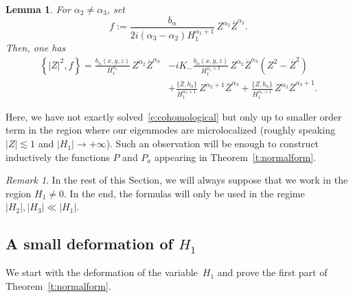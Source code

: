 \documentclass[JEP,XML,SOM,Unicode, NoEqCountersInSection,published]{cedram}
\theoremstyle{plain}
\newtheorem{lemm}[theo]{Lemma}
\theoremstyle{definition}
\theoremstyle{remark}
\newtheorem{rema}[theo]{Remark}
\begin{document}
\begin{lemm}\label{l:cohomological} For $\alpha_2\neq \alpha_3$, set
\[
f:=\frac{b_\alpha}{2i(\alpha_3-\alpha_2)H_1^{\alpha_1+1}}\,Z^{\alpha_2}\overline{Z}^{\alpha_3}.
\]
Then, one has
\begin{align*}
\left\{|Z|^2,f\right\} =\frac{b_\alpha(x,y,z)}{H_1^{\alpha_1}}\,Z^{\alpha_2}\overline{Z}^{\alpha_3}&-iK_-\frac{b_\alpha(x,y,z)}{H_1^{\alpha_1+2}}\,Z^{\alpha_2}\overline{Z}^{\alpha_3}(Z^2-\overline{Z}^2)\\
& +\frac{\{\overline{Z},b_\alpha\}}{H_1^{\alpha_1+1}}\,Z^{\alpha_2+1}\overline{Z}^{\alpha_3}+\frac{\{Z,b_\alpha\}}{H_1^{\alpha_1+1}}\,Z^{\alpha_2}\overline{Z}^{\alpha_3+1}.
\end{align*}
\end{lemm}
Here, we have not exactly solved~\eqref{e:cohomological} but only up to smaller order term in the region where our eigenmodes are microlocalized (roughly speaking $|Z|\lesssim1$ and $|H_1|\to+\infty$). Such an observation will be enough to construct inductively the functions $P$ and $P_a$ appearing in Theorem~\ref{t:normalform}.

\begin{rema}
In the rest of this Section, we will always suppose that we work in the region $H_1\neq 0$. In the end, the formulas will only be used in the regime $|H_2|,|H_3|\ll |H_1|$.
\end{rema}

\subsection{A small deformation of $H_1$}
We start with the deformation of the variable~$H_1$ and prove the first part of Theorem~\ref{t:normalform}.
\end{document}
